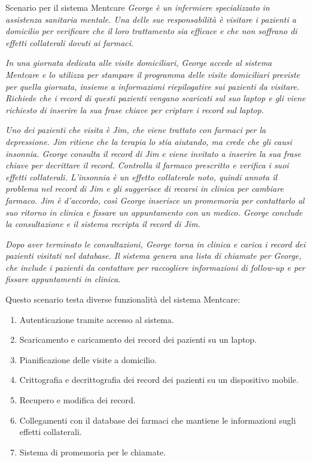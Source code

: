 \begin{Example}{Scenario per il sistema Mentcare}{}
\textit{George è un infermiere specializzato in assistenza sanitaria mentale. Una delle sue responsabilità è visitare i pazienti a domicilio per verificare che il loro trattamento sia efficace e che non soffrano di effetti collaterali dovuti ai farmaci.}

\textit{In una giornata dedicata alle visite domiciliari, George accede al sistema Mentcare e lo utilizza per stampare il programma delle visite domiciliari previste per quella giornata, insieme a informazioni riepilogative sui pazienti da visitare. Richiede che i record di questi pazienti vengano scaricati sul suo laptop e gli viene richiesto di inserire la sua frase chiave per criptare i record sul laptop.}

\textit{Uno dei pazienti che visita è Jim, che viene trattato con farmaci per la depressione. Jim ritiene che la terapia lo stia aiutando, ma crede che gli causi insonnia. George consulta il record di Jim e viene invitato a inserire la sua frase chiave per decrittare il record. Controlla il farmaco prescritto e verifica i suoi effetti collaterali. L'insonnia è un effetto collaterale noto, quindi annota il problema nel record di Jim e gli suggerisce di recarsi in clinica per cambiare farmaco. Jim è d'accordo, così George inserisce un promemoria per contattarlo al suo ritorno in clinica e fissare un appuntamento con un medico. George conclude la consultazione e il sistema recripta il record di Jim.}

\textit{Dopo aver terminato le consultazioni, George torna in clinica e carica i record dei pazienti visitati nel database. Il sistema genera una lista di chiamate per George, che include i pazienti da contattare per raccogliere informazioni di follow-up e per fissare appuntamenti in clinica.}
\end{Example}

Questo scenario testa diverse funzionalità del sistema Mentcare:
\begin{enumerate}
    \item Autenticazione tramite accesso al sistema.
    \item Scaricamento e caricamento dei record dei pazienti su un laptop.
    \item Pianificazione delle visite a domicilio.
    \item Crittografia e decrittografia dei record dei pazienti su un dispositivo mobile.
    \item Recupero e modifica dei record.
    \item Collegamenti con il database dei farmaci che mantiene le informazioni sugli effetti collaterali.
    \item Sistema di promemoria per le chiamate.
\end{enumerate}

